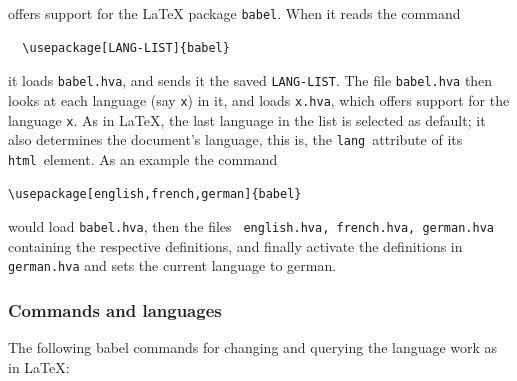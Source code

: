 \hevea{} offers support for the \LaTeX{} package {\tt babel}. When it reads the command

\begin{verbatim}
  \usepackage[LANG-LIST]{babel}
\end{verbatim}

it loads {\tt babel.hva}, and sends it the saved {\tt LANG-LIST}.  The
file {\tt babel.hva} then looks at each language (say {\tt{}x}) in it,
and loads {\tt x.hva}, which offers support for the language {\tt x}.
As in \LaTeX, the last language in the list is selected as default; it
also determines the document's language, this is,
the \verb+lang+~attribute of its \verb+html+~element.  As an example
the command

\begin{verbatim}
\usepackage[english,french,german]{babel}
\end{verbatim}

would load {\tt babel.hva}, then the files {\tt
english.hva, french.hva, german.hva} containing the respective
definitions, and finally activate the definitions in {\tt german.hva}
and sets the current language to german.

\subsubsection{Commands and languages}

The following babel commands for changing and querying the language
work as in \LaTeX:

